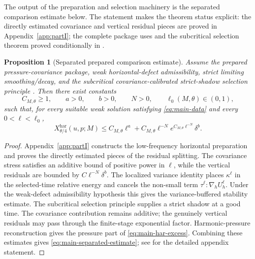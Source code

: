 \documentclass[11pt]{article}
\numberwithin{equation}{section}
\theoremstyle{plain}
\newtheorem{proposition}{Proposition}[section]
\theoremstyle{definition}
\theoremstyle{remark}
\newcommand{\har}{\mathrm{har}}
\begin{document}
The output of the preparation and selection machinery is the separated comparison estimate below.  The statement makes the theorem status explicit: the directly estimated covariance and vertical residual pieces are proved in Appendix~\ref{app:partI}; the complete package uses  and the subcritical selection theorem proved conditionally in .

\begin{proposition}[Separated prepared comparison estimate]\label{prop:main-prepared-comparison}
Assume the prepared pressure-covariance package, weak horizontal-defect admissibility, strict limiting smoothing/decay, and the subcritical covariance-calibrated strict-shadow selection principle .  Then there exist constants
\[
        C_{M,\theta}\ge1,
        \qquad a>0,
        \qquad b>0,
        \qquad N>0,
        \qquad \ell_0(M,\theta)\in(0,1),
\]
such that, for every suitable weak solution satisfying \eqref{eq:main-data} and every \(0<\ell<\ell_0\),
\begin{equation}\label{eq:main-separated-estimate}
        X^{\har}_{\theta/4}(u,p;M)
        \le
        C_{M,\theta}\ell^a
        +C_{M,\theta}\ell^{-N}e^{C_{M,\theta}\ell^{-N}}\delta^b.
\end{equation}
\end{proposition}

\begin{proof}
Appendix~\ref{app:partI} constructs the low-frequency horizontal preparation and proves the directly estimated pieces of the residual splitting.  The covariance stress satisfies an additive bound of positive power in \(\ell\), while the vertical residuals are bounded by \(C\ell^{-N}\delta^b\).  The localized variance identity places \(\kappa^\ell\) in the selected-time relative energy and cancels the non-small term \(\tau^\ell:\nabla_hU_h^\ell\).  Under the weak-defect admissibility hypothesis this gives the variance-buffered stability estimate.  The subcritical selection principle supplies a strict shadow at a good time.  The covariance contribution remains additive; the genuinely vertical residuals may pass through the finite-stage exponential factor.  Harmonic-pressure reconstruction gives the pressure part of \eqref{eq:main-har-excess}.  Combining these estimates gives \eqref{eq:main-separated-estimate}; see  for the detailed appendix statement.
\end{proof}
\end{document}
